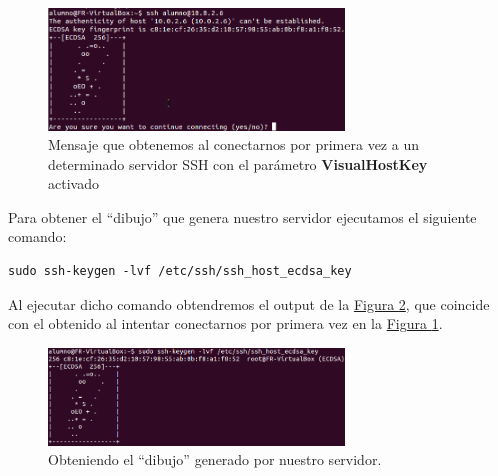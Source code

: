 \documentclass[10pt,a4paper,spanish]{article}
\begin{document}
\begin{figure}[!h]
    \centering
    \includegraphics[width=0.7\textwidth]{visualhostkey}
    \caption{Mensaje que obtenemos al conectarnos por primera vez a un determinado servidor SSH con el parámetro \textbf{VisualHostKey} activado}
    \label{visualhostkey}
\end{figure}

Para obtener el ``dibujo'' que genera nuestro servidor ejecutamos el siguiente comando:
\begin{verbatim}
sudo ssh-keygen -lvf /etc/ssh/ssh_host_ecdsa_key
\end{verbatim}

Al ejecutar dicho comando obtendremos el output de la \hyperref[visualhostkey1]{Figura \ref*{visualhostkey1}}, que coincide con el obtenido al intentar conectarnos por primera vez en la \hyperref[visualhostkey]{Figura \ref*{visualhostkey}}.

\begin{figure}[!h]
    \centering
    \includegraphics[width=0.7\textwidth]{comprobacion_visualkey}
    \caption{Obteniendo el ``dibujo'' generado por nuestro servidor.}
    \label{visualhostkey1}
\end{figure}


\end{document}
